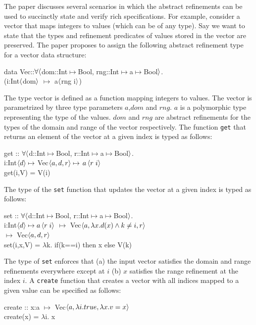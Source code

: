 The paper discusses several scenarios in which the abstract refinements can be used to succinctly state and verify rich specifications. For example, consider a vector that maps integers to values (which can be of any type).
Say we want to state that the types and refinement predicates of values stored in
the vector are preserved. The paper proposes to assign the following abstract refinement type for a vector data structure:
%
\begin{myprogram}
data Vec::$\forall \langle$dom::Int$\mapsto$Bool, rng::Int$\mapsto$a$\mapsto$Bool$\rangle$. \\
\> (i:Int$\langle$dom$\rangle$ $\mapsto$ a$\langle$rng i$\rangle$)
\end{myprogram}
%
The type vector is defined as a function mapping integers to values. 
The vector is parametrized by three type parameters $a$,$dom$ and $rng$.
$a$ is a polymorphic type representing the type of the values.
$dom$ and $rng$ are abstract refinements for the types of the domain and range of the vector respectively.
The function \texttt{get} that returns an element of the vector at a given index is typed as follows:
%
\begin{myprogram}
get :: $\forall \langle$d::Int$\mapsto$Bool, r::Int$\mapsto$a$\mapsto$Bool$\rangle$. \\
\> \> i:Int$\left< d \right> \mapsto$ Vec$\left< a,d,r \right> \mapsto$ $a\left< r \; i \right>$ \\
\> get(i,V) = V(i)
\end{myprogram}
%
The type of the \texttt{set} function that updates the vector at a given index is typed as follows:
%
\begin{myprogram}
set :: $\forall \langle$d::Int$\mapsto$Bool, r::Int$\mapsto$a$\mapsto$Bool$\rangle$. \\
\> \> i:Int$\left< d \right> \mapsto a\left< r \; i \right>$ $\mapsto$ 
Vec$\left< a,\lambda x. d(x) \wedge k \ne i,r \right>$ \\
\> \> $\mapsto$ Vec$\left< a,d,r \right>$ \\
\> set(i,x,V) = $\lambda$k. if(k==i)  then x else V(k)
\end{myprogram}
%
The type of \texttt{set} enforces that (a) the input vector satisfies the
domain and range refinements everywhere except at $i$ (b) $x$ satisfies the range refinement at the index $i$.
A \texttt{create} function that creates a vector with all indices mapped 
to a given value can be specified as follows:
%
\begin{myprogram}
create :: x:a $\mapsto$ Vec$\left< a,\lambda i.true,\lambda x. v = x \right>$  \\
\> create(x) = $\lambda$i. x
\end{myprogram}
